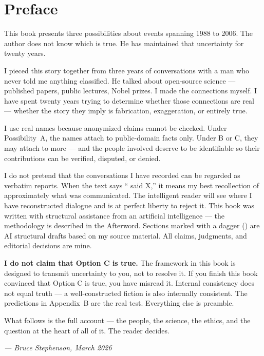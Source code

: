 
\chapter*{Preface}
\label{front:preface}

This book presents three possibilities about events spanning 1988 to 2006. The author does not know which is true. He has maintained that uncertainty for twenty years.

\vspace{0.5cm}

I pieced this story together from three years of conversations with a man who never told me anything classified. He talked about open-source science --- published papers, public lectures, Nobel prizes. I made the connections myself. I have spent twenty years trying to determine whether those connections are real --- whether the story they imply is fabrication, exaggeration, or entirely true.

I use real names because anonymized claims cannot be checked. Under Possibility~A, the names attach to public-domain facts only. Under B or C, they may attach to more --- and the people involved deserve to be identifiable so their contributions can be verified, disputed, or denied.

I do not pretend that the conversations I have recorded can be regarded as verbatim reports. When the text says `` said X,'' it means my best recollection of approximately what was communicated. The intelligent reader will see where I have reconstructed dialogue and is at perfect liberty to reject it. This book was written with structural assistance from an artificial intelligence --- the methodology is described in the Afterword. Sections marked with a dagger (\dag) are AI structural drafts based on my source material. All claims, judgments, and editorial decisions are mine.

\textbf{I do not claim that Option C is true.} The framework in this book is designed to transmit uncertainty to you, not to resolve it. If you finish this book convinced that Option C is true, you have misread it. Internal consistency does not equal truth --- a well-constructed fiction is also internally consistent. The predictions in Appendix~B are the real test. Everything else is preamble.

What follows is the full account --- the people, the science, the ethics, and the question at the heart of all of it. The reader decides.

\vspace{0.5cm}

\hfill\textit{--- Bruce Stephenson, March 2026}

